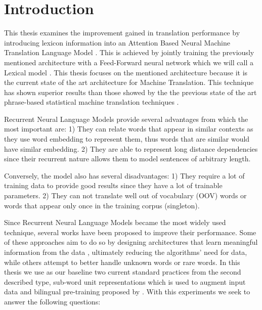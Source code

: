 
\chapter{Introduction}

This thesis examines the improvement gained in translation performance by introducing lexicon information into an Attention Based Neural Machine Translation Language Model \citep{DBLP:journals/corr/BahdanauCB14}. This is achieved by jointly training the previously mentioned architecture with a Feed-Forward neural network which we will call a Lexical model \citep{DBLP:journals/corr/abs-1710-01329}. 
This thesis focuses on the mentioned architecture because it is the current state of the art architecture for Machine Translation. This technique has shown superior results than those showed by the the previous state of the art phrase-based statistical machine translation techniques \citep{DBLP:journals/corr/abs-1709-07809}.  

Recurrent Neural Language Models provide several advantages from which the most important are: 1) They can relate words that appear in similar contexts as they use word embedding to represent them, thus words that are similar would have similar embedding. 2) They are able to represent long distance dependencies since their recurrent nature allows them to model sentences of arbitrary length. 

Conversely, the model also has several disadvantages: 1) They require a lot of training data to provide good results since they have a lot of trainable parameters. 2) They can not translate well out of vocabulary (OOV) words or words that appear only once in the training corpus (singleton).

Since Recurrent Neural Language Models became the most widely used technique, several works have been proposed to improve their performance. Some of these approaches aim to do so by designing architectures that learn meaningful information from the data \citep*{DBLP:journals/corr/MiWI16}, ultimately reducing the algorithms' need for data, while others attempt to better handle unknown words or rare words. In this thesis we use as our baseline two current standard practices from the second described type, sub-word unit representations which is used to augment input data \citep{DBLP:journals/corr/SennrichHB15} and bilingual pre-training proposed by \citet{DBLP:journals/corr/ZophYMK16}. With this experiments we seek to answer the following questions:

